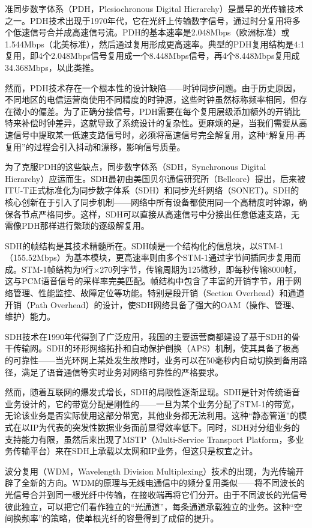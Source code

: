 准同步数字体系（PDH，Plesiochronous Digital Hierarchy）是最早的光传输技术之一。PDH技术出现于1970年代，它在光纤上传输数字信号，通过时分复用将多个低速信号合并成高速信号流。PDH的基本速率是2.048Mbps（欧洲标准）或1.544Mbps（北美标准），然后通过复用形成更高速率。典型的PDH复用结构是4:1复用，即4个2.048Mbps信号复用成一个8.448Mbps信号，再4个8.448Mbps复用成34.368Mbps，以此类推。

然而，PDH技术存在一个根本性的设计缺陷——时钟同步问题。由于历史原因，不同地区的电信运营商使用不同精度的时钟源，这些时钟虽然标称频率相同，但存在微小的偏差。为了正确分接信号，PDH需要在每个复用层级添加额外的开销比特来补偿时钟差异，这就导致了系统设计的复杂性。更麻烦的是，当我们需要从高速信号中提取某一低速支路信号时，必须将高速信号完全解复用，这种“解复用-再复用”的过程会引入抖动和漂移，影响信号质量。

为了克服PDH的这些缺点，同步数字体系（SDH，Synchronous Digital Hierarchy）应运而生。SDH最初由美国贝尔通信研究所（Bellcore）提出，后来被ITU-T正式标准化为同步数字体系（SDH）和同步光纤网络（SONET）。SDH的核心创新在于引入了同步机制——网络中所有设备都使用同一个高精度时钟源，确保各节点严格同步。这样，SDH可以直接从高速信号中分接出任意低速支路，无需像PDH那样进行繁琐的逐级解复用。

SDH的帧结构是其技术精髓所在。SDH帧是一个结构化的信息块，以STM-1（155.52Mbps）为基本模块，更高速率则由多个STM-1通过字节间插同步复用而成。STM-1帧结构为9行×270列字节，传输周期为125微秒，即每秒传输8000帧，这与PCM语音信号的采样率完美匹配。帧结构中包含了丰富的开销字节，用于网络管理、性能监控、故障定位等功能。特别是段开销（Section Overhead）和通道开销（Path Overhead）的设计，使SDH网络具备了强大的OAM（操作、管理、维护）能力。

SDH技术在1990年代得到了广泛应用，我国的主要运营商都建设了基于SDH的骨干传输网。SDH的环形网络拓扑和自动保护倒换（APS）机制，使其具备了极高的可靠性——当光环网上某处发生故障时，业务可以在50毫秒内自动切换到备用路径，满足了语音通信等实时业务对网络可靠性的严格要求。

然而，随着互联网的爆发式增长，SDH的局限性逐渐显现。SDH是针对传统语音业务设计的，它的带宽分配是刚性的——一旦为某个业务分配了STM-1的带宽，无论该业务是否实际使用这部分带宽，其他业务都无法利用。这种“静态管道”的模式在以IP为代表的突发性数据业务面前显得效率低下。同时，SDH对分组业务的支持能力有限，虽然后来出现了MSTP（Multi-Service Transport Platform，多业务传输平台）来在SDH上承载以太网和IP业务，但这只是权宜之计。

波分复用（WDM，Wavelength Division Multiplexing）技术的出现，为光传输开辟了全新的方向。WDM的原理与无线电通信中的频分复用类似——将不同波长的光信号合并到同一根光纤中传输，在接收端再将它们分开。由于不同波长的光信号彼此独立，可以把它们看作独立的“光通道”，每条通道承载独立的业务。这种“空间换频率”的策略，使单根光纤的容量得到了成倍的提升。

